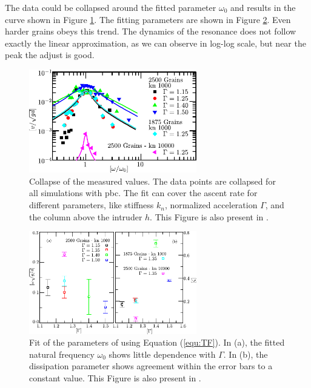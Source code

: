     The data could be collapsed around the fitted parameter $\omega_0$ and results in the curve shown in Figure \ref{fig:BNE_collapse}. The fitting parameters are shown in Figure \ref{fig:BNE_fit_parameters}. Even harder grains obeys this trend. The dynamics of the resonance does not follow exactly the linear approximation, as we can observe in log-log scale, but near the peak the adjust is good.

\begin{figure}[H]
    \centering
    \includegraphics[width=0.65\textwidth]{04-figuras/BNE_Collapse.pdf}
    \caption[BNE with periodic boundary: resonance collapse.]{Collapse of the measured values. The data points are collapsed for all simulations with pbc. The fit can cover the ascent rate for different parameters, like stiffness $k_n$, normalized acceleration $\Gamma$, and the column above the intruder $h$. This Figure is also present in \cite{Large-deviation_quantification_of_boundary_conditions_on_the_Brazil_nut_effect}.}
    \label{fig:BNE_collapse}
\end{figure}

\begin{figure}[H]
    \centering
    \includegraphics[width=0.65\textwidth]{04-figuras/BNE_Fit.pdf}
    \caption[BNE with periodic boundary: resonance fitting parameters.]{Fit of the parameters of using Equation (\ref{equ:TF}). In (a), the fitted natural frequency $\omega_0$ shows little dependence with $\Gamma$. In (b), the dissipation parameter shows agreement within the error bars to a constant value. This Figure is also present in \cite{Large-deviation_quantification_of_boundary_conditions_on_the_Brazil_nut_effect}.}
    \label{fig:BNE_fit_parameters}
\end{figure}

